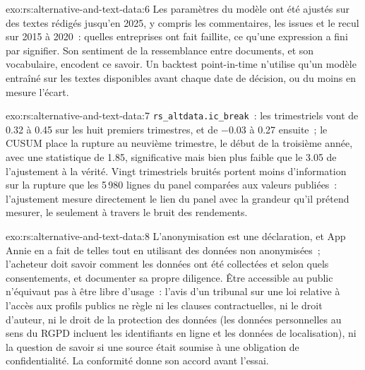 \begin{solution}{exo:rs:alternative-and-text-data:6}
Les paramètres du modèle ont été ajustés sur des textes rédigés jusqu'en 2025, y compris les commentaires, les issues et le recul sur 2015 à 2020~: quelles
entreprises ont fait faillite, ce qu'une expression a fini par signifier. Son sentiment de la ressemblance entre documents, et son vocabulaire, encodent ce savoir. Un
backtest point-in-time n'utilise qu'un modèle entraîné sur les textes disponibles avant chaque date de décision, ou du moins en mesure l'écart.
\end{solution}

\begin{solution}{exo:rs:alternative-and-text-data:7}
\texttt{rs\_altdata.ic\_break}~: les  trimestriels vont de 0.32 à 0.45 sur les huit premiers trimestres, et de $-0.03$ à 0.27 ensuite~; le CUSUM place la rupture
au neuvième trimestre, le début de la troisième année, avec une statistique de 1.85, significative mais bien plus faible que le 3.05 de l'ajustement à la vérité.
Vingt  trimestriels bruités portent moins d'information sur la rupture que les 5\,980 lignes du panel comparées aux valeurs publiées~: l'ajustement mesure
directement le lien du panel avec la grandeur qu'il prétend mesurer, le  seulement à travers le bruit des rendements.
\end{solution}

\begin{solution}{exo:rs:alternative-and-text-data:8}
L'anonymisation est une déclaration, et App Annie en a fait de telles tout en utilisant des données non anonymisées~; l'acheteur doit savoir comment les données
ont été collectées et selon quels consentements, et documenter sa propre diligence. Être accessible au public n'équivaut pas à être libre d'usage~: l'avis d'un tribunal
sur une loi relative à l'accès aux profils publics ne règle ni les clauses contractuelles, ni le droit d'auteur, ni le droit de la protection des données (les données personnelles au sens du RGPD
incluent les identifiants en ligne et les données de localisation), ni la question de savoir si une source était soumise à une obligation de confidentialité. La conformité donne son accord avant l'essai.
\end{solution}

